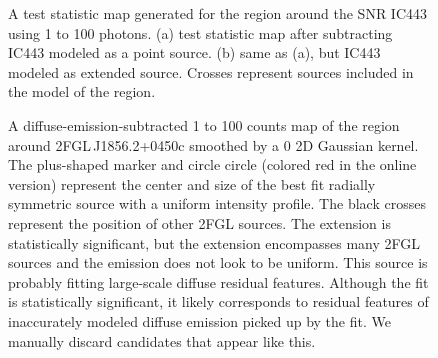 \documentclass[12pt,preprint]{aastex}
\newif\ifcolorfigure
\newcommand{\gev}{\text{GeV}\xspace}
\begin{document}
\begin{figure}
  \ifcolorfigure
    \plotone{ic443_plots/res_tsmap_ic443_color.eps}
    \else
    \fi

  \caption{
  A test statistic map generated for the region around the SNR 
  IC443 using 1 \gev to 100 \gev photons.  (a) test statistic map after
  subtracting IC443 modeled as a point source. (b) same as (a), but
  IC443 modeled as extended source. Crosses represent sources included
  in the model of the region.}
  \label{res_tsmaps}
\end{figure}

\clearpage
\begin{figure}
    \ifcolorfigure
    \plotone{source_plots/example_bad_fit_color.eps}
    \else
    \fi
    \caption{
    A diffuse-emission-subtracted 1 \gev to 100 \gev counts map of the
    region around 2FGL\,J1856.2+0450c smoothed by a 0 2D Gaussian
    kernel. The plus-shaped marker and circle circle (colored red in
    the online version) represent the center and size of the best fit
    radially symmetric source with a uniform intensity profile.  The black
    crosses represent the position of other 2FGL sources.  The extension
    is statistically significant, but the extension encompasses many 2FGL
    sources and the emission does not look to be uniform. This source
    is probably fitting large-scale diffuse residual features. Although
    the fit is statistically significant, it likely corresponds to
    residual features of inaccurately modeled diffuse emission picked
    up by the fit.  We manually discard candidates that appear like this.
    }
    \label{example_bad_fit}
\end{figure}
\end{document}
